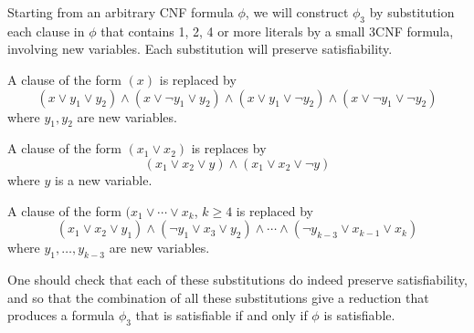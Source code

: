 Starting from an arbitrary CNF formula $\phi$,
we will construct $\phi_3$ by substitution each clause in
$\phi$ that contains 1, 2, 4 or more literals by a small 3CNF
formula, involving new variables. Each substitution will
preserve satisfiability.

A clause of the form $(x)$ is replaced by 
\[ (x \vee y_1 \vee y_2) \wedge  (x \vee \neg y_1 \vee y_2)
\wedge  (x \vee y_1 \vee \neg y_2) \wedge  (x \vee \neg y_1 \vee \neg y_2) \]
where $y_1,y_2$ are new variables.

A clause of the form $(x_1 \vee x_2)$ is replaces by
\[ (x_1 \vee x_2 \vee y) \wedge (x_1 \vee x_2 \vee \neg y)\]
where $y$ is a new variable.

A clause of the form $(x_1 \vee \cdots \vee x_k$, $k\geq 4$ is
replaced by
\[ (x_1 \vee x_2 \vee y_1) \wedge (\neg y_1 \vee x_3 \vee y_2)
\wedge \cdots \wedge (\neg y_{k-3} \vee x_{k-1} \vee x_k) \]
where $y_1,\ldots,y_{k-3}$ are new variables.

One should check that each of these substitutions do indeed
preserve satisfiability, and so that the combination of all these
substitutions give a reduction that produces a formula $\phi_3$ that
is satisfiable if and only if $\phi$ is satisfiable.



